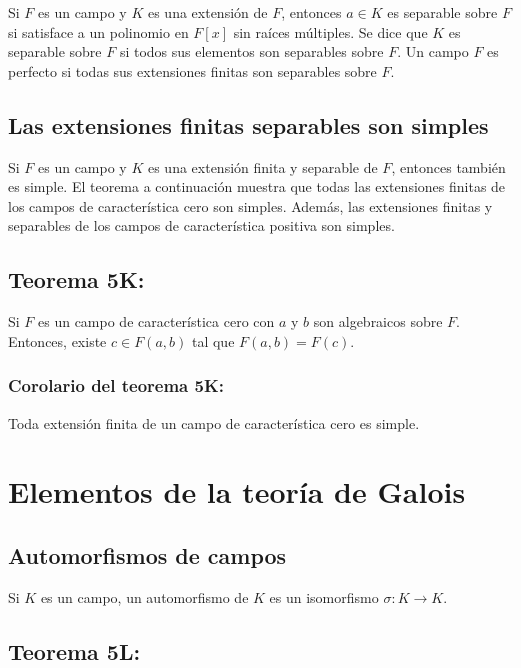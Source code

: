 \documentclass{article}
\begin{document}
Si $F$ es un campo y $K$ es una extensión de $F$, entonces $a\in K$ es separable sobre $F$ si satisface a un polinomio en $F[x]$ sin raíces múltiples. Se dice que $K$ es separable sobre $F$ si todos sus elementos son separables sobre $F$. Un campo $F$ es perfecto si todas sus extensiones finitas son separables sobre $F$.

\subsection*{\color{purple} Las extensiones finitas separables son simples}

Si $F$ es un campo y $K$ es una extensión finita y separable de $F$, entonces también es simple. El teorema a continuación muestra que todas las extensiones finitas de los campos de característica cero son simples. Además, las extensiones finitas y separables de los campos de característica positiva son simples.

\subsection*{\color{red} Teorema 5K:}

Si $F$ es un campo de característica cero con $a$ y $b$ son algebraicos sobre $F$. Entonces, existe $c\in F(a,b)$ tal que $F(a,b)=F(c)$.

\subsubsection*{\color{red} Corolario del teorema 5K:}

Toda extensión finita de un campo de característica cero es simple.

\newpage
\section{Elementos de la teoría de Galois}

\subsection*{\color{violet} Automorfismos de campos}

Si $K$ es un campo, un automorfismo de $K$ es un isomorfismo $\sigma:K\to K$.

\subsection*{\color{red} Teorema 5L:}
\end{document}
